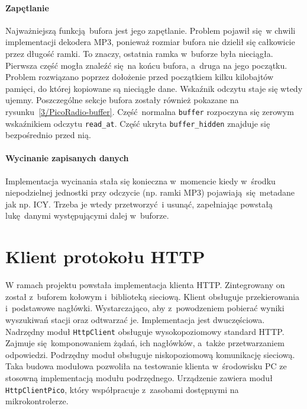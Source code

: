 \documentclass[polish]{aghengthesis}
\begin{document}
		\paragraph{Zapętlanie}
			Najważniejszą funkcją bufora jest jego zapętlanie. Problem pojawił się w chwili implementacji dekodera MP3, ponieważ rozmiar bufora nie dzielił się całkowicie przez długość ramki. To znaczy, ostatnia ramka w~buforze była nieciągła. Pierwsza część mogła znaleźć się na końcu bufora, a~druga na jego początku. Problem rozwiązano poprzez dołożenie przed początkiem kilku kilobajtów pamięci, do której kopiowane są nieciągłe dane. Wskaźnik odczytu staje się wtedy ujemny. Poszczególne sekcje bufora zostały również pokazane na rysunku~\ref{3/PicoRadio-buffer}. Część normalna \lstinline|buffer| rozpoczyna się zerowym wskaźnikiem odczytu \lstinline|read_at|. Część ukryta \lstinline|buffer_hidden| znajduje się bezpośrednio przed nią.
		
		\paragraph{Wycinanie zapisanych danych}
			Implementacja wycinania stała się konieczna w~momencie kiedy w~środku niepodzielnej jednostki przy odczycie (np. ramki MP3) pojawiają się metadane jak np. ICY. Trzeba je wtedy przetworzyć i usunąć, zapełniając powstałą lukę danymi występującymi dalej w~buforze.
	
	\section{Klient protokołu HTTP}
		W ramach projektu powstała implementacja klienta HTTP. Zintegrowany on został z~buforem kołowym i~biblioteką sieciową.
		Klient obsługuje przekierowania i~podstawowe nagłówki. Wystarczająco, aby z~powodzeniem pobierać wyniki wyszukiwań stacji oraz odtwarzać je. Implementacja jest dwuczęściowa. Nadrzędny moduł \lstinline|HttpClient| obsługuje wysokopoziomowy standard HTTP. Zajmuje się komponowaniem żądań, ich nagłówków, a~także przetwarzaniem odpowiedzi. Podrzędny moduł obsługuje niskopoziomową komunikację sieciową. Taka budowa modułowa pozwoliła na testowanie klienta w~środowisku PC ze stosowną implementacją modułu podrzędnego. Urządzenie zawiera moduł \lstinline|HttpClientPico|, który współpracuje z~zasobami dostępnymi na mikrokontrolerze.
		$ $\\
		
\end{document}

